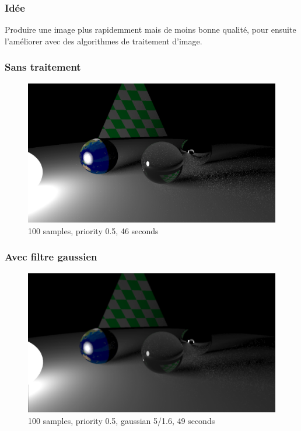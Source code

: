 \documentclass[handout]{beamer}
\begin{document}
\begin{frame}
    \frametitle{Idée}
    Produire une image plus rapidemment mais de moins bonne qualité, pour ensuite l'améliorer avec des algorithmes de traitement d'image.
\end{frame}

\begin{frame}
    \frametitle{Sans traitement}

    \begin{figure}
        \includegraphics[scale=0.25]{priorisation.png}
        \caption{100 samples, priority 0.5, 46 seconds}
    \end{figure}

\end{frame}

\begin{frame}
    \frametitle{Avec filtre gaussien}

    \begin{figure}
        \includegraphics[scale=0.25]{gaussian5.png}
        \caption{100 samples, priority 0.5, gaussian 5/1.6, 49 seconds}
    \end{figure}

\end{frame}
\end{document}
